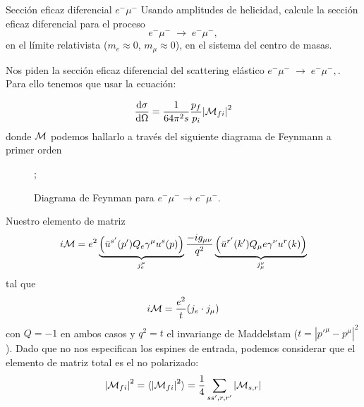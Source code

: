 

\begin{Ejercicio}{Sección eficaz diferencial $e^-\mu^-$}\label{Ej:12}
	Usando amplitudes de helicidad, calcule la sección eficaz diferencial para el proceso
	\[
		e^- \mu^- \;\to\; e^- \mu^-,
	\]
	en el límite relativista ($m_e \approx 0$, $m_\mu \approx 0$), en el sistema del centro de masas.
\end{Ejercicio}

Nos piden la sección eficaz diferencial del scattering elástico $e^- \mu^- \;\to\; e^- \mu^-,$. Para ello tenemos que usar la ecuación:

\begin{equation}
	\dv{\sigma}{\Omega} = \frac{1}{64 \pi^2 s} \frac{p_f}{p_i} \vqty{\Mcal_{fi}}^2
\end{equation}
donde $\mathcal{M}$ podemos hallarlo a través del siguiente diagrama de Feynmann a primer orden
\begin{figure}[h]
	\centering
	;

	\caption{Diagrama de Feynman para \(e^- \mu^- \to e^- \mu^-\).}
\end{figure}
Nuestro elemento de matriz
\begin{equation}
	i \Mcal =e^2 \underbrace{\pqty{\bar{u}^{s'}(p') Q_e  \gamma^\mu u^{s}(p)}}_{j_e^\mu}  \frac{-ig_{\mu \nu}}{q^2}  \underbrace{\pqty{\bar{u}^{r'}(k') Q_\mu e \gamma^\nu u^{r}(k)}}_{{j_\mu^\nu} }
\end{equation}
tal que
\begin{equation}
	i \mathcal{M} =\frac{e^2}{t} (j_e \cdot j_\mu)
\end{equation}
con $Q=-1$ en ambos casos y $q^2=t$ el invariange de Maddelstam ($t=|p'^\mu-p^\mu|^2$). Dado que no nos especifican los espines de entrada, podemos considerar que el elemento de matriz total es el no polarizado:
\begin{equation}
	\vqty{\Mcal_{fi}}^2 = \langle \vqty{\Mcal_{fi}}^2 \rangle = \frac{1}{4} \sum_{ss',r,r'} \vqty{\Mcal_{s,r}}
\end{equation}
